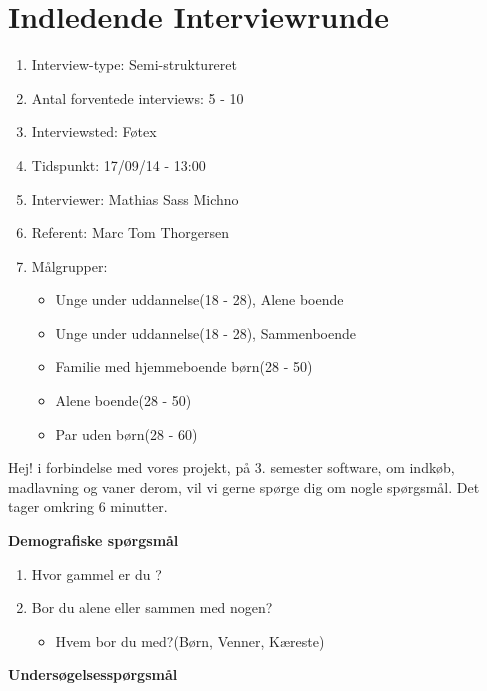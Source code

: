 \chapter{Indledende Interviewrunde}

\begin{enumerate}[topsep=0ex]
	\setlength{\itemsep}{0em}
   \item Interview-type: Semi-struktureret
   \item Antal forventede interviews: 5 - 10
   \item Interviewsted: Føtex
   \item Tidspunkt: 17/09/14 - 13:00
   \item Interviewer: Mathias Sass Michno
   \item Referent: Marc Tom Thorgersen
   \item Målgrupper:
   	\begin{itemize}
   		\item Unge under uddannelse(18 - 28), Alene boende
   		\item Unge under uddannelse(18 - 28), Sammenboende
   		\item Familie med hjemmeboende børn(28 - 50)
	    \item Alene boende(28 - 50)
   		\item Par uden børn(28 - 60)	
   	\end{itemize} 
\end{enumerate}

Hej! i forbindelse med vores projekt, på 3. semester software, om indkøb, madlavning og vaner derom,  vil vi gerne spørge dig om nogle spørgsmål. Det tager omkring 6 minutter.

\textbf{Demografiske spørgsmål}
\begin{enumerate}[topsep=0ex]
	\setlength{\itemsep}{0em}
	\item  Hvor gammel er du ?
	\item  Bor du alene eller sammen med nogen?
	\begin{itemize}
	\item Hvem bor du med?(Børn, Venner, Kæreste)
	\end{itemize} 
\end{enumerate}

\textbf{Undersøgelsesspørgsmål}
		   
